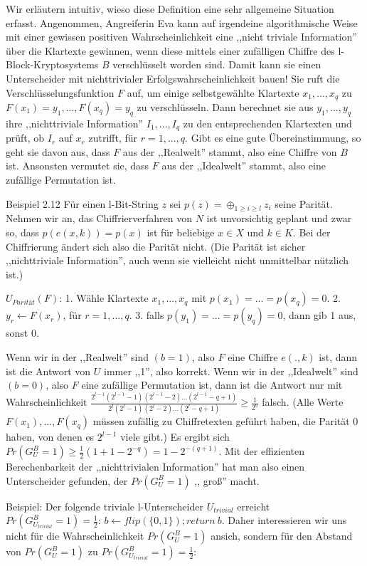 \documentclass[a4paper]{article}
\begin{document}
\begin{multicols}{3}
Wir erläutern intuitiv, wieso diese Definition eine sehr allgemeine Situation erfasst. Angenommen, Angreiferin Eva kann auf irgendeine algorithmische Weise mit einer gewissen positiven Wahrscheinlichkeit eine ,,nicht triviale Information'' über die Klartexte gewinnen, wenn diese mittels einer zufälligen Chiffre des l-Block-Kryptosystems $B$ verschlüsselt worden sind. Damit kann sie einen Unterscheider mit nichttrivialer Erfolgswahrscheinlichkeit bauen! Sie ruft die Verschlüsselungsfunktion $F$ auf, um einige selbstgewählte Klartexte $x_1,...,x_q$ zu $F(x_1)=y_1,...,F(x_q)=y_q$ zu verschlüsseln. Dann berechnet sie aus $y_1,...,y_q$ ihre ,,nichttriviale Information'' $I_1,...,I_q$ zu den entsprechenden Klartexten und prüft, ob $I_r$ auf $x_r$ zutrifft, für $r=1,...,q$. Gibt es eine gute Übereinstimmung, so geht sie davon aus, dass $F$ aus der ,,Realwelt'' stammt, also eine Chiffre von $B$ ist. Ansonsten vermutet sie, dass $F$ aus der ,,Idealwelt'' stammt, also eine zufällige Permutation ist.

Beispiel 2.12 Für einen l-Bit-String $z$ sei $p(z)=\oplus_{1 \geq i\geq l} z_i$ seine Parität. Nehmen wir an, das Chiffrierverfahren von $N$ ist unvorsichtig geplant und zwar so, dass $p(e(x,k)) =p(x)$ ist für beliebige $x\in X$ und $k\in K$. Bei der Chiffrierung ändert sich also die Parität nicht. (Die Parität ist sicher ,,nichttriviale Information'', auch wenn sie vielleicht nicht unmittelbar nützlich ist.)

$U_{Parität}(F)$:
1. Wähle Klartexte $x_1,...,x_q$ mit $p(x_1)=...=p(x_q) = 0$.
2. $y_r\leftarrow F(x_r)$, für $r=1,...,q$.
3. falls $p(y_1)=...=p(y_q)=0$, dann gib 1 aus, sonst 0.

Wenn wir in der  ,,Realwelt''  sind $(b=1)$, also $F$ eine Chiffre $e(.,k)$ ist, dann ist die Antwort von $U$ immer ,,1'', also korrekt. Wenn wir in der ,,Idealwelt'' sind $(b=0)$, also $F$ eine zufällige Permutation ist, dann ist die Antwort nur mit Wahrscheinlichkeit $\frac{2^{l-1} (2^{l-1} -1)(2^{l-1}-2)...(2^{l-1} -q+ 1)}{2^l (2^l-1)(2^l-2)...(2^l-q+ 1)} \geq \frac{1}{2^q}$ falsch. (Alle Werte $F(x_1),...,F(x_q)$ müssen zufällig zu Chiffretexten geführt haben, die Parität 0 haben, von denen es $2^{l-1}$ viele gibt.) Es ergibt sich $Pr(G^B_U= 1)\geq\frac{1}{2} (1+1-2^{-q}) =1-2^{-(q+1)}$. Mit der effizienten Berechenbarkeit der ,,nichttrivialen Information'' hat man also einen Unterscheider gefunden, der $Pr(G^B_U=1)$ ,, groß'' macht.

Beispiel: Der folgende triviale l-Unterscheider $U_{trivial}$ erreicht $Pr(G^B_{U_{trivial}}= 1)=\frac{1}{2}$: $b\leftarrow flip(\{0,1\}); return\ b$.
Daher interessieren wir uns nicht für die Wahrscheinlichkeit $Pr(G^B_U= 1)$ ansich, sondern für den Abstand von $Pr(G^B_U=1)$ zu $Pr(G^B_{U_{trivial}}= 1) =\frac{1}{2}$:


\end{multicols}
\end{document}
